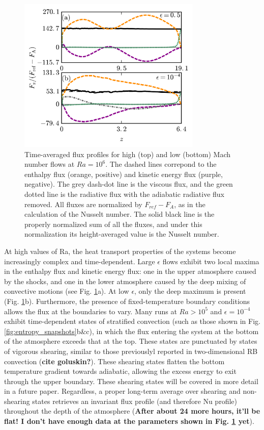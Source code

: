 \documentclass[aps, prl, twocolumn, groupedaddress, amsfonts, amssymb, amsmath]{revtex4-1}
\begin{document}
\begin{figure}[t]
\includegraphics[width=3.4375in]{./figs/fluxes_fig.png}
\caption{Time-averaged flux profiles for high (top) and low (bottom) Mach number flows at $Ra = 10^6$.  
The dashed lines correpond to the
enthalpy flux (orange, positive) and kinetic energy flux (purple, negative).  The grey dash-dot line is the
viscous flux, and the green dotted line is the radiative flux with the adiabatic radiative flux removed. All
fluxes are normalized by $F_{ref} - F_A$, as in the calculation of the Nusselt number.  The solid black line is
the properly normalized sum of all the fluxes, and under this normalization its height-averaged value is the
Nusselt number.
\label{fig:flux_profiles} }
\end{figure}

At high values of Ra, the heat transport properties of the systems become increasingly complex and time-dependent.
Large $\epsilon$ flows exhibit two local maxima in the enthalpy flux and kinetic energy flux: one in the upper 
atmosphere caused by the shocks, and one in the lower atmosphere caused by the deep mixing of convective motions
(see Fig. \ref{fig:flux_profiles}a).
At low $\epsilon$, only the deep maximum is present (Fig. \ref{fig:flux_profiles}b).  
Furthermore, the presence
of fixed-temperature boundary conditions allows the flux at the boundaries to vary.  Many runs at $Ra > 10^5$ and
$\epsilon = 10^{-4}$ exhibit time-dependent states of stratified convection (such as those shown in 
Fig. \ref{fig:entropy_snapshots}b\&c), in which the flux entering the system at the bottom of the atmosphere exceeds
that at the top.  These states are punctuated by states of vigorous shearing, similar to those previouslyl
reported in two-dimensional RB convection (\textbf{cite goluskin?}).  These shearing states flatten the bottom temperature
gradient towards adiabatic, allowing the excess energy to exit through the upper boundary.  These shearing
states will be covered in more detail in a future paper.  Regardless, a proper long-term average over shearing
and non-shearing states retrieves an invariant flux profile (and therefore Nu profile) throughout the depth
of the atmosphere (\textbf{After about 24 more hours, it'll be flat!  I don't have enough data at the parameters
shown in Fig. \ref{fig:flux_profiles} yet}).
\end{document}
